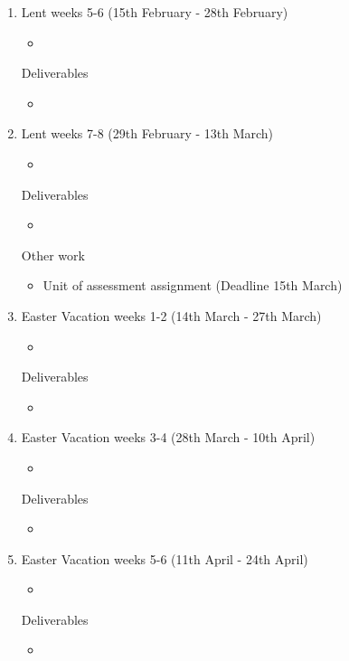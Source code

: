 \documentclass[12pt,a4paper]{article}
\begin{document}
\begin{enumerate}
    \item Lent weeks 5-6 (15th February - 28th February)
    \begin{itemize}
        \item 
    \end{itemize}
    Deliverables
    \begin{itemize}
        \item 
    \end{itemize}

    \item Lent weeks 7-8 (29th February - 13th March)
    \begin{itemize}
        \item 
    \end{itemize}
    Deliverables
    \begin{itemize}
        \item 
    \end{itemize}
    Other work
    \begin{itemize}
        \item Unit of assessment assignment (Deadline 15th March)
    \end{itemize}

    \item Easter Vacation weeks 1-2 (14th March - 27th March)
    \begin{itemize}
        \item 
    \end{itemize}
    Deliverables
    \begin{itemize}
        \item 
    \end{itemize}

    \item Easter Vacation weeks 3-4 (28th March - 10th April)
    \begin{itemize}
        \item 
    \end{itemize}
    Deliverables
    \begin{itemize}
        \item 
    \end{itemize}

    \item Easter Vacation weeks 5-6 (11th April - 24th April)
    \begin{itemize}
        \item 
    \end{itemize}
    Deliverables
    \begin{itemize}
        \item 
    \end{itemize}


\end{enumerate}
\end{document}
